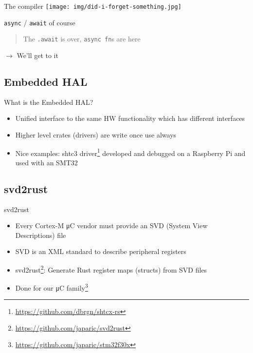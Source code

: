 \documentclass[aspectratio=1610,14pt,t]{beamer}
\begin{document}
\begin{frame}[c]{The compiler}
  \texttt{[image: img/did-i-forget-something.jpg]}
\end{frame}

\begin{frame}[c]{\texttt{async} / \texttt{await} of course}

  \begin{quote}
    The \texttt{.await} is over, \texttt{async fn}s are here
  \end{quote}

  $\rightarrow$ We'll get to it
\end{frame}

\subsection{Embedded HAL}

\begin{frame}[c]{What is the Embedded HAL?}
  \begin{itemize}
  \item Unified interface to the same HW functionality which has different
    interfaces
  \item Higher level crates (drivers) are write once use always
  \item Nice examples: shtc3
    driver\footnote{\url{https://github.com/dbrgn/shtcx-rs}} developed and
    debugged on a  Raspberry Pi and used with an SMT32
  \end{itemize}
\end{frame}

\subsection{svd2rust}

\begin{frame}[c]{svd2rust}
  \begin{itemize}
    \item Every Cortex-M μC vendor must provide an SVD (System View
      Descriptions) file
    \item SVD is an XML standard to describe peripheral registers
    \item svd2rust\footnote{\url{https://github.com/japaric/svd2rust}}:
      Generate Rust register maps (structs) from SVD files
    \item Done for our μC family\footnote{\url{https://github.com/japaric/stm32f30x}}
  \end{itemize}
\end{frame}
\end{document}
